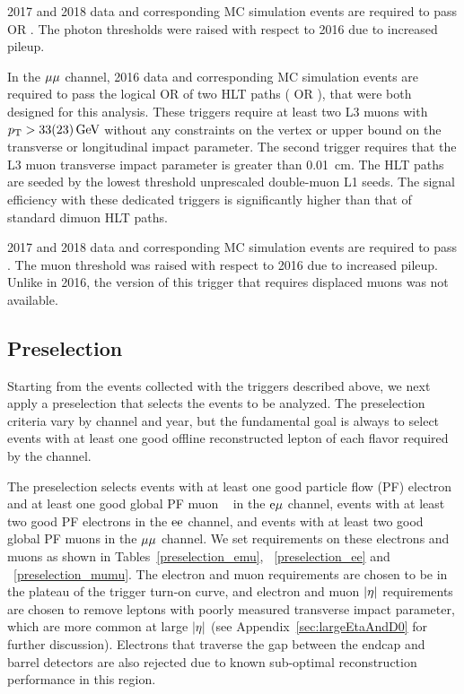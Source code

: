 2017 and 2018 data and corresponding MC simulation events are required to pass  OR  . The photon \ET thresholds were raised with respect to 2016 due to increased pileup.

In the ${\mu}{\mu}$ channel, 2016 data and corresponding MC simulation events are required to pass the logical OR of two HLT paths ( OR ), that were both designed for this analysis. These triggers require at least two L3 muons with $p_{\mathrm{T}}>33(23)\,\text{Ge\hspace{-.08em}V}$ without any constraints on the vertex or upper bound on the transverse or longitudinal impact parameter. The second trigger requires that the L3 muon transverse impact parameter is greater than 0.01~\unit{cm}. The HLT paths are seeded by the lowest \pt threshold unprescaled double-muon L1 seeds. The signal efficiency with these dedicated triggers is significantly higher than that of standard dimuon HLT paths.

2017 and 2018 data and corresponding MC simulation events are required to pass . The muon \pt threshold was raised with respect to 2016 due to increased pileup. Unlike in 2016, the version of this trigger that requires displaced muons was not available.


\subsection{Preselection}
\label{preselection}
Starting from the events collected with the triggers described above, we next apply a preselection that selects the events to be analyzed. The preselection criteria vary by channel and year, but the fundamental goal is always to select events with at least one good offline reconstructed lepton of each flavor required by the channel. 

The preselection selects events with at least one good particle flow (PF) electron and at least one good global PF muon ~\cite{CMS-PRF-14-001} in the $\mathrm{e}{\mu}$ channel, events with at least two good PF electrons in the $\mathrm{e}\mathrm{e}$ channel, and events with at least two good global PF muons in the ${\mu}{\mu}$ channel.  We set requirements on these electrons and muons as shown in Tables~\ref{preselection_emu}, ~\ref{preselection_ee} and ~\ref{preselection_mumu}. The electron and muon \pt  requirements are chosen to be in the plateau of the trigger turn-on curve, and electron and muon $\lvert \eta \rvert$ requirements are chosen to remove leptons with poorly measured transverse impact parameter, which are more common at large $\lvert \eta \rvert$ (see Appendix~\ref{sec:largeEtaAndD0} for further discussion). Electrons that traverse the gap between the endcap and barrel detectors are also rejected due to known sub-optimal reconstruction performance in this region.

